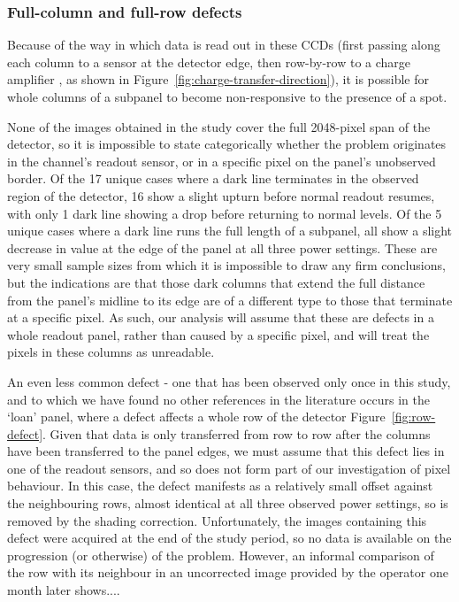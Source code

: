 \documentclass[\main/IO-Pixels.tex]{subfiles}
\begin{document}
\subsubsection{Full-column and full-row defects}

Because of the way in which data is read out in these CCDs (first passing along each column to a sensor at the detector edge, then row-by-row to a charge amplifier , as shown in Figure~\ref{fig:charge-transfer-direction}), it is possible for whole columns of a subpanel to become non-responsive to the presence of a spot. 

None of the images obtained in the study cover the full 2048-pixel span of the detector, so it is impossible to state categorically whether the problem originates in the channel's readout sensor, or in a specific pixel on the panel's unobserved border. Of the 17 unique cases where a dark line terminates in the observed region of the detector, 16 show a slight upturn before normal readout resumes, with only 1 dark line showing a drop before returning to normal levels. Of the 5 unique cases where a dark line runs the full length of a subpanel, all show a slight decrease in value at the edge of the panel at all three power settings. These are very small sample sizes from which it is impossible to draw any firm conclusions, but the indications are that those dark columns that extend the full distance from the panel's midline to its edge are of a different type to those that terminate at a specific pixel. As such, our analysis will assume that these are defects in a whole readout panel, rather than caused by a specific pixel, and will treat the pixels in these columns as unreadable.

An even less common defect - one that has been observed only once in this study, and to which we have found no other references in the literature  occurs in the `loan' panel, where a defect affects a whole row of the detector Figure~\ref{fig:row-defect}. Given that data is only transferred from row to row after the columns have been transferred to the panel edges, we must assume that this defect lies in one of the readout sensors, and so does not form part of our investigation of pixel behaviour. In this case, the defect manifests as a relatively small offset against the neighbouring rows, almost identical at all three observed power settings, so is removed by the shading correction. Unfortunately, the images containing this defect were acquired at the end of the study period, so no data is available on the progression (or otherwise) of the problem. However, an informal comparison of the row with its neighbour in an uncorrected image provided by the operator one month later shows.... 
\end{document}
